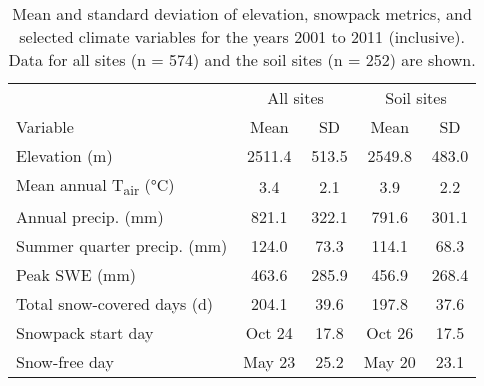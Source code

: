 \begin{table}[p]

\centering

\caption{ Mean and standard deviation of elevation, snowpack metrics, and selected climate variables for the years 2001 to 2011 (inclusive). Data for all sites (n = 574) and the soil sites (n = 252) are shown.\label{snotelnetwork_t}}

\begin{tabular}{lcccc}
\toprule

{} & \multicolumn{2}{c}{All sites} & \multicolumn{2}{c}{Soil sites}\\

\cmidrule(l){2-3} \cmidrule(l){4-5}

Variable	&Mean	&SD	&Mean	&SD\\
\midrule
Elevation (m)	&2511.4	&513.5	&2549.8	&483.0\\
Mean annual T\textsubscript{air} (°C)	&3.4	&2.1	&3.9	&2.2\\
Annual precip. (mm)	&821.1	&322.1	&791.6	&301.1\\
Summer quarter precip. (mm)	&124.0	&73.3	&114.1	&68.3\\
Peak SWE (mm)	&463.6	&285.9	&456.9	&268.4\\
Total snow-covered days (d)	&204.1	&39.6	&197.8	&37.6\\
Snowpack start day	&Oct 24	&17.8	&Oct 26	&17.5\\
Snow-free day	&May 23	&25.2	&May 20	&23.1\\
\bottomrule
\end{tabular}

\end{table}
